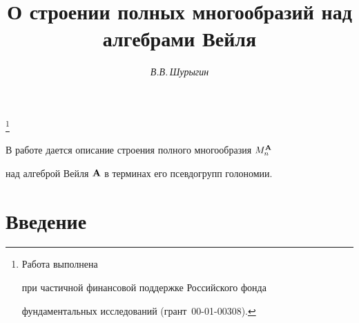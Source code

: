 

\setcounter{page}{88}















\author{\it В.В.\,Шурыгин}




\title{О строении полных многообразий над алгебрами Вейля}


\thanks{Работа выполнена


при частичной финансовой поддержке Российского фонда


фундаментальных исследований (грант \No\,00-01-00308).}





\date{}




\pagestyle{plain} %







\maketitle


\label{begin}











В работе дается описание строения полного многообразия  $M^{\bold A}_n$


над алгеброй Вейля  ${\bold A}$ в терминах его псевдогрупп голономии.








\section{Введение}





